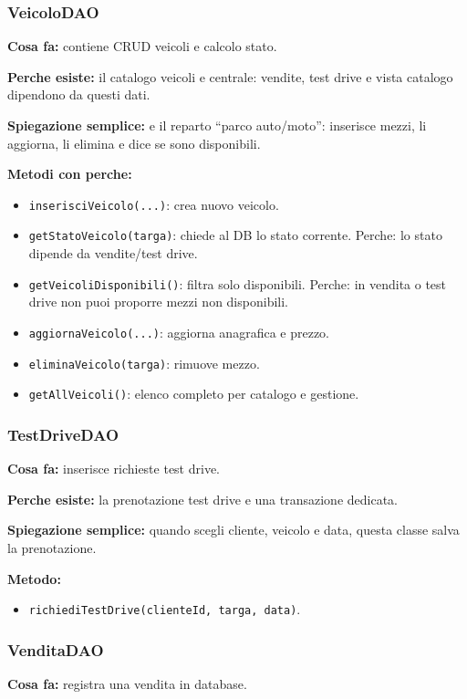 \documentclass[12pt,a4paper]{article}
\begin{document}
\subsubsection*{VeicoloDAO}
\textbf{Cosa fa:}
contiene CRUD veicoli e calcolo stato.

\textbf{Perche esiste:}
il catalogo veicoli e centrale: vendite, test drive e vista catalogo dipendono da questi dati.

\textbf{Spiegazione semplice:}
e il reparto ``parco auto/moto'': inserisce mezzi, li aggiorna, li elimina e dice se sono disponibili.

\textbf{Metodi con perche:}
\begin{itemize}
  \item \texttt{inserisciVeicolo(...)}: crea nuovo veicolo.
  \item \texttt{getStatoVeicolo(targa)}: chiede al DB lo stato corrente. Perche: lo stato dipende da vendite/test drive.
  \item \texttt{getVeicoliDisponibili()}: filtra solo disponibili. Perche: in vendita o test drive non puoi proporre mezzi non disponibili.
  \item \texttt{aggiornaVeicolo(...)}: aggiorna anagrafica e prezzo.
  \item \texttt{eliminaVeicolo(targa)}: rimuove mezzo.
  \item \texttt{getAllVeicoli()}: elenco completo per catalogo e gestione.
\end{itemize}

\subsubsection*{TestDriveDAO}
\textbf{Cosa fa:}
inserisce richieste test drive.

\textbf{Perche esiste:}
la prenotazione test drive e una transazione dedicata.

\textbf{Spiegazione semplice:}
quando scegli cliente, veicolo e data, questa classe salva la prenotazione.

\textbf{Metodo:}
\begin{itemize}
  \item \texttt{richiediTestDrive(clienteId, targa, data)}.
\end{itemize}

\subsubsection*{VenditaDAO}
\textbf{Cosa fa:}
registra una vendita in database.
\end{document}
